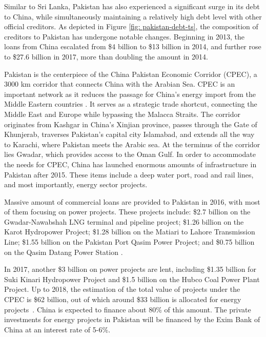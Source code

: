 Similar to Sri Lanka, Pakistan has also experienced a significant surge in its debt to China, while simultaneously maintaining a relatively high debt level with other official creditors. As depicted in Figure \ref{fig: pakistan-debt-ts}, the composition of creditors to Pakistan has undergone notable changes.  Beginning in 2013, the loans from China escalated from \$4 billion to \$13 billion in 2014, and further rose to \$27.6 billion in 2017, more than doubling the amount in 2014.


Pakistan is the centerpiece of the China Pakistan Economic Corridor (CPEC), a 3000 km corridor that connects China with the Arabian Sea.
CPEC is an important network as it reduces the passage for China's energy import from the Middle Eastern countries \citep*{CPEC-wiki}.
It serves as a strategic trade shortcut, connecting the Middle East and Europe while bypassing the Malacca Straits. The corridor originates from Kashgar in China's Xinjian province, passes through the Gate of Khunjerab, traverses Pakistan's capital city Islamabad, and extends all the way to Karachi, where Pakistan meets the Arabic sea. At the terminus of the corridor lies Gwadar, which provides access to the Oman Gulf.
In order to accommodate the needs for CPEC, China has launched enormous amounts of infrastructure in Pakistan after 2015. These items include a deep water port, road and rail lines, and most importantly, energy sector projects.

Massive amount of commercial loans are provided to Pakistan in 2016, with most of them focusing on power projects.
These projects include:
\$2.7 billion on the Gwadar-Nawabshah LNG terminal and pipeline project;
\$1.26 billion on the Karot Hydropower Project;
\$1.28 billion on the Matiari to Lahore Transmission Line;
\$1.55 billion on the Pakistan Port Qasim Power Project; and \$0.75 billion on the Qasim Datang Power Station \citep*{Horn-Reinhart-Trebesch-21}.

In 2017, another \$3 billion on power projects are lent, including \$1.35 billion for Suki Kinari Hydropower Project and \$1.5 billion on the Hubco Coal Power Plant Project.
Up to 2018, the estimation of the total value of projects under the CPEC is \$62 billion, out of which around \$33 billion is allocated for energy projects~\citep*{Hurley19-8-debt-trap}. China is expected to finance about 80\% of this amount. The private investments for energy projects in Pakistan will be financed by the Exim Bank of China at an interest rate of 5-6\%.

